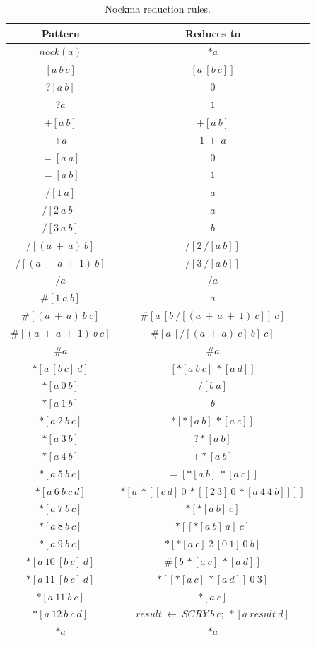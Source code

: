 \documentclass[
    11pt,            %
    techreport,        %
    affiltop,       %
]{art}
\begin{document}
\begin{table}[!h]
\begin{center}
\begin{tabular}{|c|c|}
\hline
Pattern & Reduces to \\
\hline
$nock(a)$ & $*a$\\
\hline
$[a\ b\ c]$ & $[a\ [b\ c]]$\\
\hline
$?[a\ b]$ & $0$\\
\hline
$?a$ & $1$\\
\hline
$+[a\ b]$ & $+[a\ b]$\\
\hline
$+a$ & $1\ +\ a$\\
\hline
$=[a\ a]$ & $0$\\
\hline
$=[a\ b]$ & $1$\\
\hline
$/[1\ a]$ & $a$\\
\hline
$/[2\ a\ b]$ & $a$\\
\hline
$/[3\ a\ b]$ & $b$\\
\hline
$/[(a\ +\ a)\ b]$ & $/[2\ /[a\ b]]$\\
\hline
$/[(a\ +\ a\ +\ 1)\ b]$ & $/[3\ /[a\ b]]$\\
\hline
$/a$ & $/a$\\
\hline
$\#[1\ a\ b]$ & $a$\\
\hline
$\#[(a\ +\ a)\ b\ c]$ & $\#[a\ [b\ /[(a\ +\ a\ +\ 1)\ c]]\ c]$\\
\hline
$\#[(a\ +\ a\ +\ 1)\ b\ c]$ & $\#[a\ [/[(a\ +\ a)\ c]\ b]\ c]$\\
\hline
$\#a$ & $\#a$\\
\hline
$*[a\ [b\ c]\ d]$ & $[*[a\ b\ c]\ *[a\ d]]$\\
\hline
$*[a\ 0\ b]$ & $/[b\ a]$\\
\hline
$*[a\ 1\ b]$ & $b$\\
\hline
$*[a\ 2\ b\ c]$ & $*[*[a\ b]\ *[a\ c]]$\\
\hline
$*[a\ 3\ b]$ & $?*[a\ b]$\\
\hline
$*[a\ 4\ b]$ & $+*[a\ b]$\\
\hline
$*[a\ 5\ b\ c]$ & $=[*[a\ b]\ *[a\ c]]$\\
\hline
$*[a\ 6\ b\ c\ d]$ & $*[a\ *[[c\ d]\ 0\ *[[2\ 3]\ 0\ *[a\ 4\ 4\ b]]]]$\\
\hline
$*[a\ 7\ b\ c]$ & $*[*[a\ b]\ c]$\\
\hline
$*[a\ 8\ b\ c]$ & $*[[*[a\ b]\ a]\ c]$\\
\hline
$*[a\ 9\ b\ c]$ & $*[*[a\ c]\ 2\ [0\ 1]\ 0\ b]$\\
\hline
$*[a\ 10\ [b\ c]\ d]$ & $\#[b\ *[a\ c]\ *[a\ d]]$\\
\hline
$*[a\ 11\ [b\ c]\ d]$ & $*[[*[a\ c]\ *[a\ d]]\ 0\ 3]$\\
\hline
$*[a\ 11\ b\ c]$ & $*[a\ c]$\\
\hline
$*[a\ 12\ b\ c\ d]$ & $result\ \leftarrow\ SCRY\ b\ c;\ *[a\ result\ d]$\\
\hline
$*a$ & $*a$ \\
\hline
\end{tabular}
\caption{Nockma reduction rules.}
\label{table:nockma}
\end{center}
\end{table}
\end{document}
